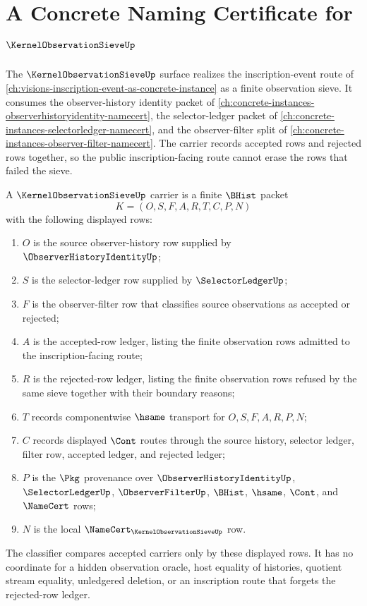 \chapter{A Concrete Naming Certificate for $\KernelObservationSieveUp$}
\label{ch:concrete-instances-kernel-observation-sieve-namecert}

The $\KernelObservationSieveUp$ surface realizes the inscription-event route of \autoref{ch:visions-inscription-event-as-concrete-instance} as a finite observation sieve. It consumes the observer-history identity packet of \autoref{ch:concrete-instances-observerhistoryidentity-namecert}, the selector-ledger packet of \autoref{ch:concrete-instances-selectorledger-namecert}, and the observer-filter split of \autoref{ch:concrete-instances-observer-filter-namecert}. The carrier records accepted rows and rejected rows together, so the public inscription-facing route cannot erase the rows that failed the sieve.

\begin{definition}
\label{def:kernel-observation-sieve-carrier}
A $\KernelObservationSieveUp$ carrier is a finite $\BHist$ packet
$$
K=(O,S,F,A,R,T,C,P,N)
$$
with the following displayed rows:
\begin{enumerate}
\item $O$ is the source observer-history row supplied by $\ObserverHistoryIdentityUp$;
\item $S$ is the selector-ledger row supplied by $\SelectorLedgerUp$;
\item $F$ is the observer-filter row that classifies source observations as accepted or rejected;
\item $A$ is the accepted-row ledger, listing the finite observation rows admitted to the inscription-facing route;
\item $R$ is the rejected-row ledger, listing the finite observation rows refused by the same sieve together with their boundary reasons;
\item $T$ records componentwise $\hsame$ transport for $O,S,F,A,R,P,N$;
\item $C$ records displayed $\Cont$ routes through the source history, selector ledger, filter row, accepted ledger, and rejected ledger;
\item $P$ is the $\Pkg$ provenance over $\ObserverHistoryIdentityUp$, $\SelectorLedgerUp$, $\ObserverFilterUp$, $\BHist$, $\hsame$, $\Cont$, and $\NameCert$ rows;
\item $N$ is the local $\NameCert_{\KernelObservationSieveUp}$ row.
\end{enumerate}
The classifier compares accepted carriers only by these displayed rows. It has no coordinate for a hidden observation oracle, host equality of histories, quotient stream equality, unledgered deletion, or an inscription route that forgets the rejected-row ledger.
\end{definition}

